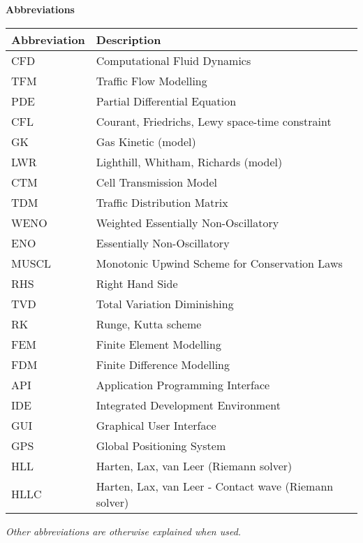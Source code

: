 \mbox{} \vspace{25mm}

\Huge \textbf{Abbreviations} \normalsize


\vspace{15mm}

\begin{center}
\begin{tabular}{l l}
	\textbf{Abbreviation} & \textbf{Description} \\
	\hline
	CFD & Computational Fluid Dynamics\\
	TFM & Traffic Flow Modelling \\
	\hline
	PDE & Partial Differential Equation\\
	CFL & Courant, Friedrichs, Lewy space-time constraint\\
	\hline
	GK & Gas Kinetic (model)\\
	LWR & Lighthill, Whitham, Richards (model)\\
	CTM & Cell Transmission Model \\
	TDM & Traffic Distribution Matrix \\
	\hline
	WENO & Weighted Essentially Non-Oscillatory\\
	ENO & Essentially Non-Oscillatory\\
	MUSCL & Monotonic Upwind Scheme for Conservation Laws\\
	RHS & Right Hand Side \\
	TVD & Total Variation Diminishing\\
	\hline
	RK & Runge, Kutta scheme \\
	\hline
	FEM & Finite Element Modelling\\
	FDM & Finite Difference Modelling\\
	\hline
	API & Application Programming Interface\\
	IDE & Integrated Development Environment\\
	GUI & Graphical User Interface\\
	GPS & Global Positioning System\\
	\hline
	HLL & Harten, Lax, van Leer (Riemann solver)\\
	HLLC & Harten, Lax, van Leer - Contact wave (Riemann solver)\\
	\hline
\end{tabular}
\end{center}


\vspace{15mm}
\emph{Other abbreviations are otherwise explained when used.}